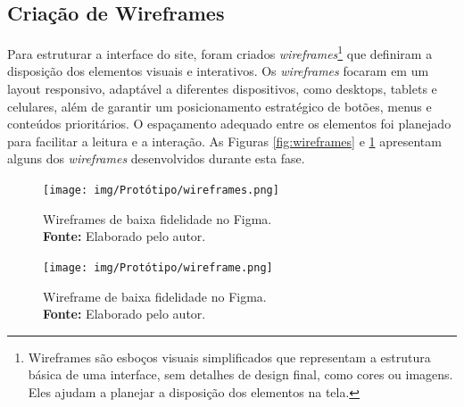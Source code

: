 \subsection{Criação de Wireframes}
Para estruturar a interface do site, foram criados \textit{wireframes}\footnote{Wireframes são esboços visuais simplificados que representam a estrutura básica de uma interface, sem detalhes de design final, como cores ou imagens. Eles ajudam a planejar a disposição dos elementos na tela.} que definiram a disposição dos elementos visuais e interativos. Os \textit{wireframes} focaram em um layout responsivo, adaptável a diferentes dispositivos, como desktops, tablets e celulares, além de garantir um posicionamento estratégico de botões, menus e conteúdos prioritários. O espaçamento adequado entre os elementos foi planejado para facilitar a leitura e a interação. As Figuras \ref{fig:wireframes} e \ref{fig:wireframe} apresentam alguns dos \textit{wireframes} desenvolvidos durante esta fase.


\begin{figure}[H]
    \centering
    \begin{minipage}[b]{0.48\textwidth}
        \centering
        \texttt{[image: img/Protótipo/wireframes.png]}
        \caption{Wireframes de baixa fidelidade no Figma. \\
            \textbf{Fonte:} Elaborado pelo autor.}
        \label{fig:wireframes}
    \end{minipage}
    \hfill
    \begin{minipage}[b]{0.48\textwidth}
        \centering
        \texttt{[image: img/Protótipo/wireframe.png]}
        \caption{Wireframe de baixa fidelidade no Figma. \\
            \textbf{Fonte:} Elaborado pelo autor.}
        \label{fig:wireframe}
    \end{minipage}
\end{figure}


